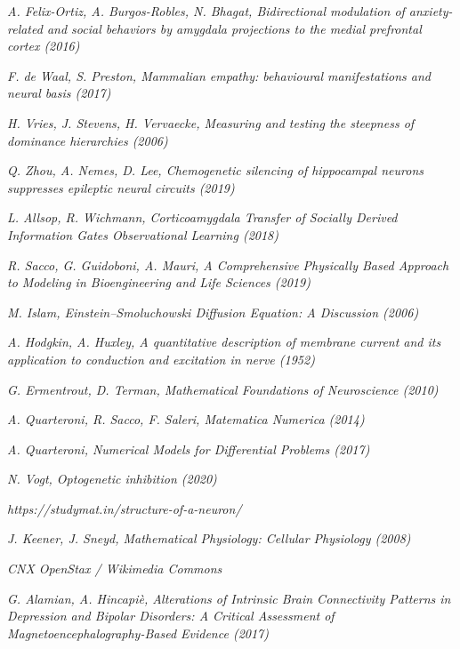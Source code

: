 \documentclass[12pt, a4paper]{report}
\begin{document}
\begin{thebibliography}{50}
	\textit{A. Felix-Ortiz, A. Burgos-Robles, N. Bhagat, Bidirectional modulation of anxiety-related and social behaviors by amygdala projections to the medial prefrontal cortex  (2016)}
	
	\textit{F. de Waal, S. Preston, Mammalian empathy: behavioural manifestations and neural basis (2017)}
	
	\textit{H. Vries, J. Stevens, H. Vervaecke, Measuring and testing the steepness of dominance hierarchies (2006)}
	
	\textit{Q. Zhou, A. Nemes, D. Lee, Chemogenetic silencing of hippocampal neurons suppresses epileptic neural circuits (2019)}
	
	\textit{L. Allsop, R. Wichmann, Corticoamygdala Transfer of Socially Derived Information Gates Observational Learning (2018)}
	
	\textit{R. Sacco, G. Guidoboni, A. Mauri, A Comprehensive Physically Based Approach to Modeling in Bioengineering and Life Sciences (2019)}
	
	\textit{M. Islam, Einstein–Smoluchowski Diffusion Equation: A Discussion (2006)}
	
	\textit{A. Hodgkin, A. Huxley, A quantitative description of membrane current and its application to conduction 
		and excitation in nerve (1952)}
	
	\textit{G. Ermentrout, D. Terman, Mathematical Foundations of Neuroscience (2010)}
	
	\textit{A. Quarteroni, R. Sacco, F. Saleri, Matematica Numerica (2014)}
	
	\textit{A. Quarteroni, Numerical Models for Differential Problems (2017)}
	
	\textit{N. Vogt, Optogenetic inhibition (2020)}
	
	\textit{https://studymat.in/structure-of-a-neuron/}
	
	\textit{J. Keener, J. Sneyd, Mathematical Physiology: Cellular Physiology (2008)}
	
	\textit{CNX OpenStax / Wikimedia Commons}
	
	\textit{G. Alamian, A. Hincapiè, Alterations of Intrinsic Brain Connectivity Patterns in Depression and Bipolar Disorders: A Critical Assessment of Magnetoencephalography-Based Evidence (2017)}
	

	
\end{thebibliography}
\end{document}
